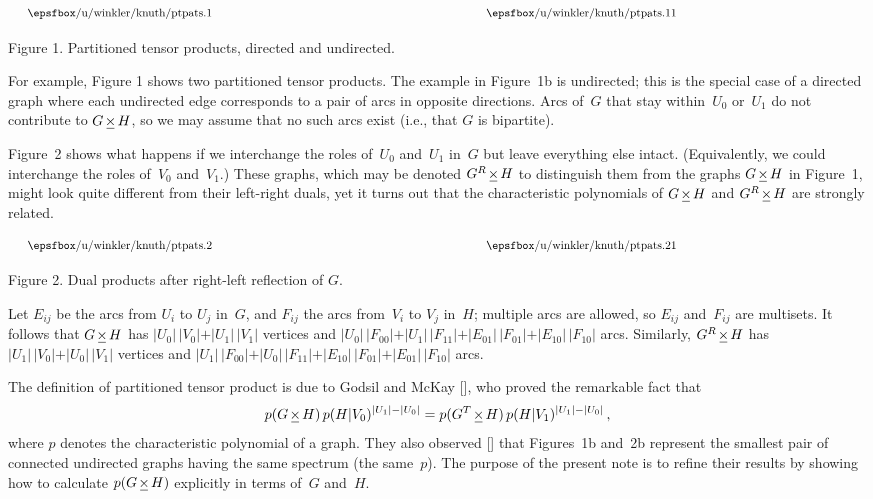 \midinsert
$$
\vcenter{\fig1/} \hskip.75in \vcenter{\fig11/}
$$
\centerline{Figure 1. Partitioned tensor products, directed and undirected.}
\endinsert

\meno
For example, Figure 1 shows two partitioned tensor products. The example in
Figure~1b is undirected; this is the special case of a directed graph where
each undirected edge corresponds to a pair of arcs in opposite directions.
Arcs of~$G$ that stay within~$U_0$ or~$U_1$ do not contribute to $G\mathbin{\underline{\mkern-2mu\times\mkern-2mu}} H$,
so we may assume that no such arcs exist (i.e., that $G$ is bipartite).

Figure~2 shows what happens if we interchange
the roles of~$U_0$ and~$U_1$ in~$G$ but leave
everything else intact. (Equivalently, we could interchange the roles of~$V_0$
and~$V_1$.) These graphs, which may be denoted $G^R\mathbin{\underline{\mkern-2mu\times\mkern-2mu}} H$ to distinguish
them from the graphs  $G\mathbin{\underline{\mkern-2mu\times\mkern-2mu}} H$  in Figure~1, might look quite different from
their left-right duals,
yet it turns out that the characteristic polynomials of $G\mathbin{\underline{\mkern-2mu\times\mkern-2mu}}
H$ and $G^R\mathbin{\underline{\mkern-2mu\times\mkern-2mu}} H$ are strongly related.

\midinsert
$$
\vcenter{\fig2/} \hskip.75in \vcenter{\fig21/}
$$
\centerline{Figure 2. Dual products after right-left reflection of $G$.}
\endinsert

Let $E_{ij}$ be the arcs from $U_i$ to $U_j$ in~$G$, and $F_{ij}$ the arcs
from~$V_i$ to $V_j$ in~$H$; multiple arcs are allowed, so $E_{ij}$ and~$F_{ij}$
are multisets. It follows that $G\mathbin{\underline{\mkern-2mu\times\mkern-2mu}} H$ has $\vert U_0\vert\,\vert V_0\vert
+\vert U_1\vert\,\vert V_1\vert$ vertices and $\vert U_0\vert\,\vert
F_{00}\vert +\vert U_1\vert\,\vert F_{11}\vert +\vert E_{01}\vert\,\vert
F_{01}\vert +\vert E_{10}\vert\,\vert F_{10}\vert$ arcs. Similarly,
$G^R\mathbin{\underline{\mkern-2mu\times\mkern-2mu}} H$ has $\vert U_1\vert\,\vert V_0\vert+\vert U_0\vert\,\vert
V_1\vert$ vertices and $\vert U_1\vert\,\vert F_{00}\vert+\vert U_0\vert\,
\vert F_{11}\vert +\vert E_{10}\vert\,\vert F_{01}\vert +\vert E_{01}\vert\,
\vert F_{10}\vert$ arcs.

The definition of partitioned tensor product is due to Godsil and McKay
[\GMi],
who proved the remarkable fact that
$$p(G\mathbin{\underline{\mkern-2mu\times\mkern-2mu}} H)\,p(H\vert V_0)^{\vert U_1\vert-\vert U_0\vert}
=p(G^T\mathbin{\underline{\mkern-2mu\times\mkern-2mu}} H)\,p(H\vert V_1)^{\vert U_1\vert-\vert U_0\vert}\,,$$
where $p$ denotes the characteristic polynomial of a graph. They also observed
[\GMii] 
that Figures~1b and~2b represent the smallest pair of connected undirected
graphs having the same spectrum (the same~$p$). The purpose of the present note
is to refine their results by showing how to calculate $p(G\mathbin{\underline{\mkern-2mu\times\mkern-2mu}} H)$
explicitly in terms of~$G$ and~$H$.

